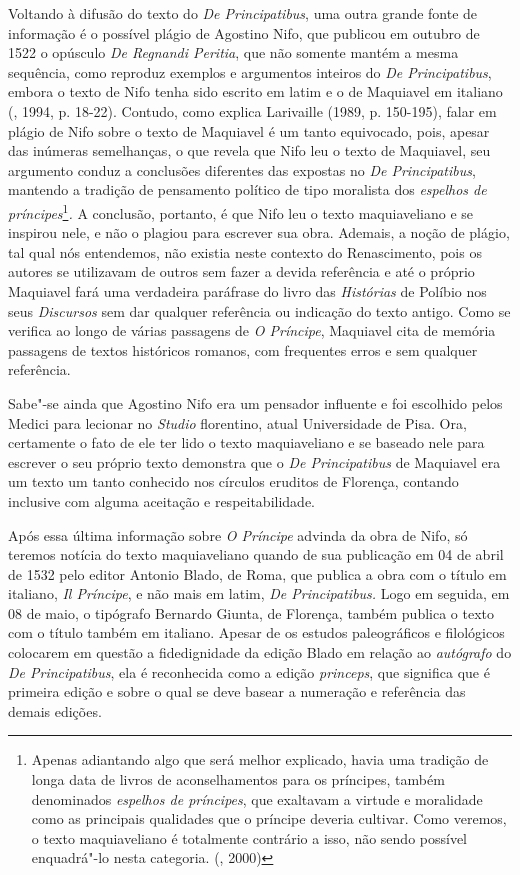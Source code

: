 Voltando à difusão do texto do \emph{De Principatibus}, uma outra grande
fonte de informação é o possível plágio de Agostino Nifo, que publicou
em outubro de 1522 o opúsculo \emph{De Regnandi Peritia}, que não
somente mantém a mesma sequência, como reproduz exemplos e argumentos
inteiros do \emph{De Principatibus}, embora o texto de Nifo tenha sido
escrito em latim e o de Maquiavel em italiano (, 1994, p. 18-22).
Contudo, como explica Larivaille (1989, p. 150-195), falar em plágio de
Nifo sobre o texto de Maquiavel é um tanto equivocado, pois, apesar das
inúmeras semelhanças, o que revela que Nifo leu o texto de Maquiavel,
seu argumento conduz a conclusões diferentes das expostas no \emph{De
Principatibus}, mantendo a tradição de pensamento político de tipo
moralista dos \emph{espelhos de príncipes}\footnote{Apenas adiantando
  algo que será melhor explicado, havia uma tradição de longa data de
  livros de aconselhamentos para os príncipes, também denominados
  \emph{espelhos de príncipes}, que exaltavam a virtude e moralidade
  como as principais qualidades que o príncipe deveria cultivar. Como
  veremos, o texto maquiaveliano é totalmente contrário a isso, não
  sendo possível enquadrá"-lo nesta categoria. (, 2000)}\emph{.} A
conclusão, portanto, é que Nifo leu o texto maquiaveliano e se inspirou
nele, e não o plagiou para escrever sua obra. Ademais, a noção de
plágio, tal qual nós entendemos, não existia neste contexto do
Renascimento, pois os autores se utilizavam de outros sem fazer a devida
referência e até o próprio Maquiavel fará uma verdadeira paráfrase do
livro  das \emph{Histórias} de Políbio nos seus \emph{Discursos} sem
dar qualquer referência ou indicação do texto antigo. Como se verifica
ao longo de várias passagens de \emph{O Príncipe}, Maquiavel cita de
memória passagens de textos históricos romanos, com frequentes erros e
sem qualquer referência.

Sabe"-se ainda que Agostino Nifo era um pensador influente e foi
escolhido pelos Medici para lecionar no \emph{Studio} florentino, atual
Universidade de Pisa. Ora, certamente o fato de ele ter lido o texto
maquiaveliano e se baseado nele para escrever o seu próprio texto
demonstra que o \emph{De Principatibus} de Maquiavel era um texto um
tanto conhecido nos círculos eruditos de Florença, contando inclusive
com alguma aceitação e respeitabilidade.

Após essa última informação sobre \emph{O Príncipe} advinda da obra de
Nifo, só teremos notícia do texto maquiaveliano quando de sua publicação
em 04 de abril de 1532 pelo editor Antonio Blado, de Roma, que publica a
obra com o título em italiano, \emph{Il Príncipe}, e não mais em latim,
\emph{De Principatibus.} Logo em seguida, em 08 de maio, o tipógrafo
Bernardo Giunta, de Florença, também publica o texto com o título também
em italiano. Apesar de os estudos paleográficos e filológicos colocarem
em questão a fidedignidade da edição Blado em relação ao
\emph{autógrafo} do \emph{De Principatibus}, ela é reconhecida como a
edição \emph{princeps}, que significa que é primeira edição e sobre o
qual se deve basear a numeração e referência das demais edições.

